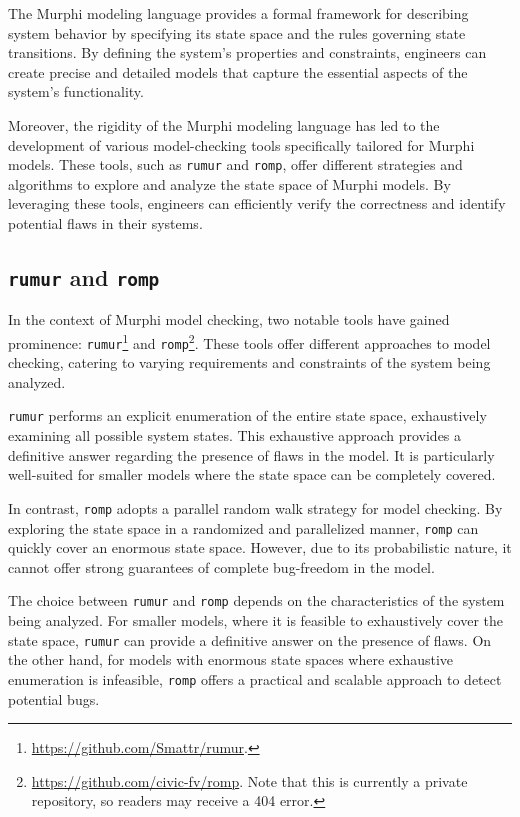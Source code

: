 The Murphi modeling language provides a formal framework for describing system
behavior by specifying its state space and the rules governing state
transitions.
By defining the system's properties and constraints, engineers can create
precise and detailed models that capture the essential aspects of the system's
functionality.

Moreover, the rigidity of the Murphi modeling language has led to the
development of various model-checking tools specifically tailored for Murphi
models.
These tools, such as \texttt{rumur} and \texttt{romp}, offer different
strategies and algorithms to explore and analyze the state space of Murphi
models.
By leveraging these tools, engineers can efficiently verify the correctness
and identify potential flaws in their systems.

\subsection{\texttt{rumur} and \texttt{romp}}\label{subsec:rumur-and-romp}

In the context of Murphi model checking, two notable tools have gained
prominence:
\texttt{rumur}\footnote{\url{https://github.com/Smattr/rumur}.}
and
\texttt{romp}\footnote{\url{https://github.com/civic-fv/romp}. Note that this
is currently a private repository, so readers may receive a 404 error.}.
These tools offer different approaches to model checking,
catering to varying requirements and constraints of the system being analyzed.

\texttt{rumur} performs an explicit enumeration of the entire state space,
exhaustively examining all possible system states.
This exhaustive approach provides a definitive answer regarding the presence of
flaws in the model.
It is particularly well-suited for smaller models where the state space can be
completely covered.

In contrast, \texttt{romp} adopts a parallel random walk strategy for model
checking.
By exploring the state space in a randomized and parallelized manner,
\texttt{romp} can quickly cover an enormous state space.
However, due to its probabilistic nature, it cannot offer strong guarantees of
complete bug-freedom in the model.

The choice between \texttt{rumur} and \texttt{romp} depends on the
characteristics of the system being analyzed.
For smaller models, where it is feasible to exhaustively cover the state space,
\texttt{rumur} can provide a definitive answer on the presence of flaws.
On the other hand, for models with enormous state spaces where exhaustive
enumeration is infeasible, \texttt{romp} offers a practical and scalable
approach to detect potential bugs.

